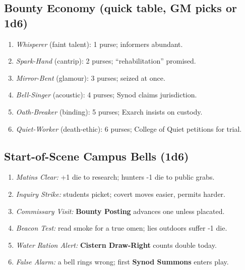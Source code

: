\subsection*{Bounty Economy (quick table, GM picks or 1d6)}
\begin{enumerate}
  \item \emph{Whisperer} (faint talent): 1 purse; informers abundant.
  \item \emph{Spark-Hand} (cantrip): 2 purses; “rehabilitation” promised.
  \item \emph{Mirror-Bent} (glamour): 3 purses; seized at once.
  \item \emph{Bell-Singer} (acoustic): 4 purses; Synod claims jurisdiction.
  \item \emph{Oath-Breaker} (binding): 5 purses; Exarch insists on custody.
  \item \emph{Quiet-Worker} (death-ethic): 6 purses; College of Quiet petitions for trial.
\end{enumerate}

\subsection*{Start-of-Scene Campus Bells (1d6)}
\begin{enumerate}
  \item \emph{Matins Clear:} +1 die to research; hunters -1 die to public grabs.
  \item \emph{Inquiry Strike:} students picket; covert moves easier, permits harder.
  \item \emph{Commissary Visit:} \textbf{Bounty Posting} advances one unless placated.
  \item \emph{Beacon Test:} read smoke for a true omen; lies outdoors suffer -1 die.
  \item \emph{Water Ration Alert:} \textbf{Cistern Draw-Right} counts double today.
  \item \emph{False Alarm:} a bell rings wrong; first \textbf{Synod Summons} enters play.
\end{enumerate}
